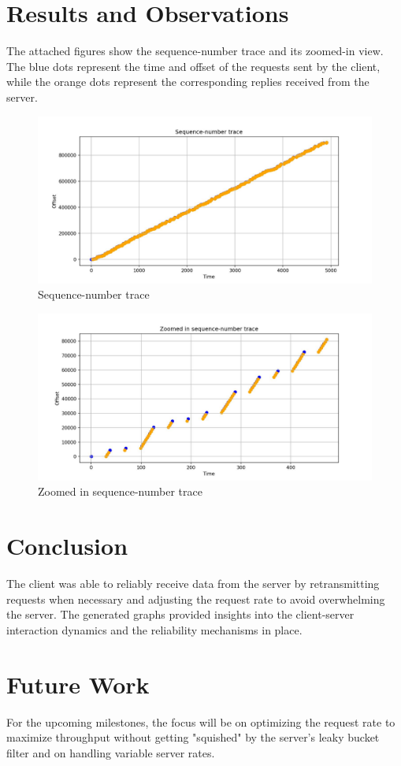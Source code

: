 \documentclass[12pt, a4paper]{article}
\begin{document}
\section{Results and Observations}
The attached figures show the sequence-number trace and its zoomed-in view. The blue dots represent the time and offset of the requests sent by the client, while the orange dots represent the corresponding replies received from the server.

\begin{figure}[h]
\centering
\includegraphics[width=0.9\linewidth]{Sequence-number trace.jpeg}
\caption{Sequence-number trace}
\label{fig:sequence_trace}
\end{figure}

\begin{figure}[h]
\centering
\includegraphics[width=0.9\linewidth]{Zoomed in sequence-number trace.jpeg}
\caption{Zoomed in sequence-number trace}
\label{fig:zoomed_trace}
\end{figure}

\section{Conclusion}
The client was able to reliably receive data from the server by retransmitting requests when necessary and adjusting the request rate to avoid overwhelming the server. The generated graphs provided insights into the client-server interaction dynamics and the reliability mechanisms in place.

\section{Future Work}
For the upcoming milestones, the focus will be on optimizing the request rate to maximize throughput without getting "squished" by the server's leaky bucket filter and on handling variable server rates.
\end{document}
